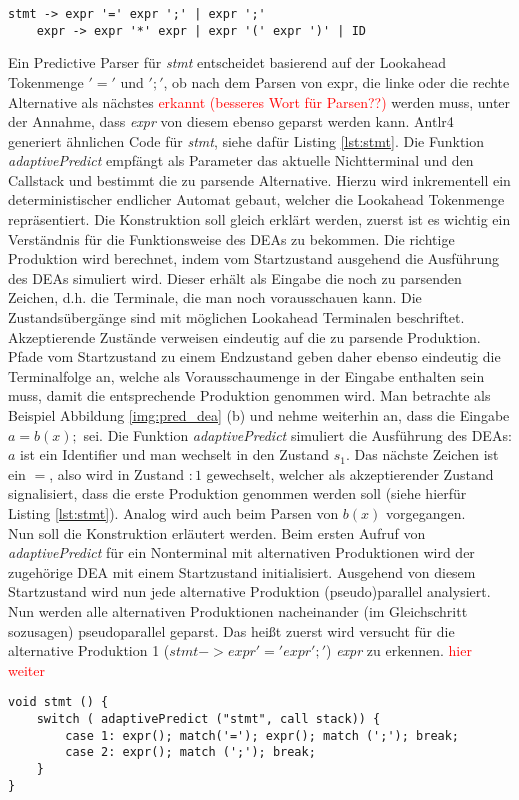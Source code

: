 \begin{lstlisting}[style=grammar, label=lst:expr_grammar]
    stmt -> expr '=' expr ';' | expr ';'
    expr -> expr '*' expr | expr '(' expr ')' | ID
\end{lstlisting}

Ein Predictive Parser für \textit{stmt} entscheidet basierend auf der Lookahead Tokenmenge ${'='}$ und ${';'}$, ob nach dem Parsen von expr, die linke oder die rechte Alternative
als nächstes \textcolor{red}{erkannt (besseres Wort für Parsen??)} werden muss, unter der Annahme, dass \textit{expr} von diesem ebenso geparst werden kann.
Antlr4 generiert ähnlichen Code für \textit{stmt}, siehe dafür Listing \ref{lst:stmt}.
Die Funktion \textit{adaptivePredict} empfängt als Parameter das aktuelle Nichtterminal und den Callstack und bestimmt die zu parsende Alternative.
Hierzu wird inkrementell ein deterministischer endlicher Automat gebaut, welcher die Lookahead Tokenmenge repräsentiert. 
Die Konstruktion soll gleich erklärt werden, zuerst ist es wichtig ein Verständnis für die Funktionsweise des DEAs zu bekommen. 
Die richtige Produktion wird berechnet, indem vom Startzustand ausgehend die Ausführung des DEAs simuliert wird. Dieser erhält als Eingabe die noch zu parsenden Zeichen, d.h. die Terminale, die man noch vorausschauen kann.
Die Zustandsübergänge sind mit möglichen Lookahead Terminalen beschriftet. Akzeptierende Zustände verweisen eindeutig auf die zu parsende Produktion. Pfade vom Startzustand zu einem Endzustand
geben daher ebenso eindeutig die Terminalfolge an, welche als Vorausschaumenge in der Eingabe enthalten sein muss, damit die entsprechende Produktion genommen wird. 
Man betrachte als Beispiel Abbildung \ref{img:pred_dea} (b) und nehme weiterhin an, dass die Eingabe $a=b(x);$ sei. 
Die Funktion \textit{adaptivePredict} simuliert die Ausführung des DEAs: $a$ ist ein Identifier und man wechselt in den Zustand $s_1$. Das nächste Zeichen ist ein $=$, also 
wird in Zustand $:1$ gewechselt, welcher als akzeptierender Zustand signalisiert, dass die erste Produktion genommen werden soll (siehe hierfür Listing \ref{lst:stmt}). 
Analog wird auch beim Parsen von $b(x)$ vorgegangen.\\
Nun soll die Konstruktion erläutert werden. 
Beim ersten Aufruf von \textit{adaptivePredict} für ein Nonterminal mit alternativen Produktionen wird der zugehörige DEA mit einem Startzustand initialisiert. 
Ausgehend von diesem Startzustand wird nun jede alternative Produktion (pseudo)parallel analysiert.   
Nun werden alle alternativen Produktionen nacheinander (im Gleichschritt sozusagen) pseudoparallel geparst.
Das heißt zuerst wird versucht für die alternative Produktion 1 ($stmt -> expr '=' expr ';'$) \textit{expr} zu erkennen. 
\textcolor{red}{hier weiter}  


\begin{lstlisting}[style=CStyle, frame=b, caption=Code zum Erkennen von stmt,label=lst:stmt]   
void stmt () { 
    switch ( adaptivePredict ("stmt", call stack)) {
        case 1: expr(); match('='); expr(); match (';'); break;
        case 2: expr(); match (';'); break;
    }   
}
\end{lstlisting}



